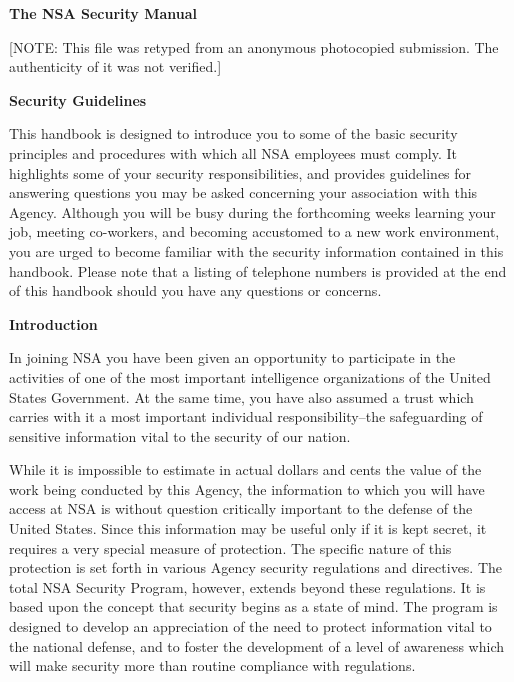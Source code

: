 \documentclass[a4]{article}
\begin{document}
\begin{center}
{\Large \bf The NSA Security Manual}
\end{center}

\vspace{3ex}

[NOTE:  This file was retyped from an anonymous photocopied submission.  The
        authenticity of it was not verified.]

\vspace{2ex}

\small

{\large \bf \noindent Security Guidelines}

This handbook is designed to introduce you to some of the basic
security principles and procedures with which all NSA employees must comply.
It highlights some of your security responsibilities, and provides guidelines
for answering questions you may be asked concerning your association with this
Agency.  Although you will be busy during the forthcoming weeks learning your
job, meeting co-workers, and becoming accustomed to a new work environment, you
are urged to become familiar with the security information contained in this
handbook.  Please note that a listing of telephone numbers is provided at the
end of this handbook should you have any questions or concerns.

\vspace{2ex}

{\large \bf \noindent Introduction}

In joining NSA you have been given an opportunity to participate in the
activities of one of the most important intelligence organizations of the
United States Government.  At the same time, you have also assumed a trust
which carries with it a most important individual responsibility--the
safeguarding of sensitive information vital to the security of our nation.

While it is impossible to estimate in actual dollars and cents the value of the
work being conducted by this Agency, the information to which you will have
access at NSA is without question critically important to the defense of the
United States.  Since this information may be useful only if it is kept secret,
it requires a very special measure of protection.  The specific nature of this
protection is set forth in various Agency security regulations and directives.
The total NSA Security Program, however, extends beyond these regulations.  It
is based upon the concept that security begins as a state of mind.  The program
is designed to develop an appreciation of the need to protect information vital
to the national defense, and to foster the development of a level of awareness
which will make security more than routine compliance with regulations.
\end{document}

